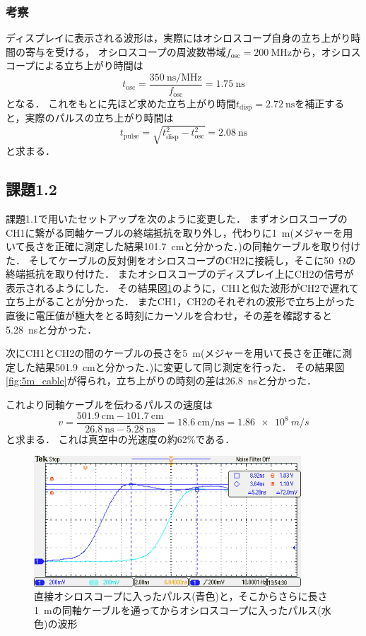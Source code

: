 \documentclass[a4paper,11pt]{jsarticle}
\begin{document}
\subsubsection{考察}
ディスプレイに表示される波形は，実際にはオシロスコープ自身の立ち上がり時間の寄与を受ける，
オシロスコープの周波数帯域$f_{\mathrm{osc}}=\SI{200}{\MHz}$から，オシロスコープによる立ち上がり時間は
\begin{equation}
  t_{\mathrm{osc}} = \frac{\SI{350}{\ns\per\MHz}}{f_{\mathrm{osc}}} = \SI{1.75}{\ns}
\end{equation}
となる．
これをもとに先ほど求めた立ち上がり時間$t_{\mathrm{disp}} = \SI{2.72}{\ns}$を補正すると，実際のパルスの立ち上がり時間は
\begin{equation}
  t_{\mathrm{pulse}} = \sqrt{t^2_{\mathrm{disp}} - t^2_{\mathrm{osc}}} = \SI{2.08}{\ns}
\end{equation}
と求まる．

\subsection{課題1.2}
課題1.1で用いたセットアップを次のように変更した．
まずオシロスコープのCH1に繋がる同軸ケーブルの終端抵抗を取り外し，代わりに\SI{1}{m}(メジャーを用いて長さを正確に測定した結果\SI{101.7}{\cm}と分かった．)の同軸ケーブルを取り付けた．
そしてケーブルの反対側をオシロスコープのCH2に接続し，そこに\SI{50}{\ohm}の終端抵抗を取り付けた．
またオシロスコープのディスプレイ上にCH2の信号が表示されるようにした．
その結果図\ref{fig:1m_cable}のように，CH1と似た波形がCH2で遅れて立ち上がることが分かった．
またCH1，CH2のそれぞれの波形で立ち上がった直後に電圧値が極大をとる時刻にカーソルを合わせ，その差を確認すると\SI{5.28}{\ns}と分かった．

次にCH1とCH2の間のケーブルの長さを\SI{5}{m}(メジャーを用いて長さを正確に測定した結果\SI{501.9}{\cm}と分かった．)に変更して同じ測定を行った．
その結果図\ref{fig:5m_cable}が得られ，立ち上がりの時刻の差は\SI{26.8}{\ns}と分かった．

これより同軸ケーブルを伝わるパルスの速度は
\begin{equation}
  v = \frac{\SI{501.9}{\cm} - \SI{101.7}{\cm}}{\SI{26.8}{\ns}- \SI{5.28}{\ns}} = \SI{18.6}{\cm\per\ns} = \SI{1.86e8}{m\per s}
\end{equation}
と求まる．
これは真空中の光速度の約62\%である．

\begin{figure}[htbp]
  \centering
  \includegraphics[width=10cm]{TEK00727.png}
  \caption{直接オシロスコープに入ったパルス(青色)と，そこからさらに長さ\SI{1}{m}の同軸ケーブルを通ってからオシロスコープに入ったパルス(水色)の波形}
  \label{fig:1m_cable}
\end{figure}
\end{document}
